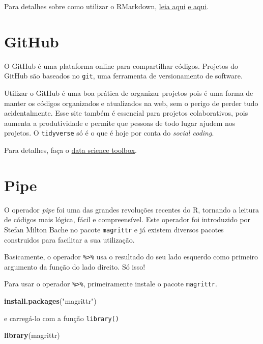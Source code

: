 \documentclass[]{book}
\newenvironment{Shaded}{\begin{snugshade}}{\end{snugshade}}
\newcommand{\KeywordTok}[1]{\textcolor[rgb]{0.13,0.29,0.53}{\textbf{{#1}}}}
\newcommand{\StringTok}[1]{\textcolor[rgb]{0.31,0.60,0.02}{{#1}}}
\newcommand{\NormalTok}[1]{{#1}}
\begin{document}
Para detalhes sobre como utilizar o RMarkdown,
\href{http://r4ds.had.co.nz/r-markdown.html}{leia aqui}
\href{http://rmarkdown.rstudio.com/lesson-1.html}{e aqui}.

\section{GitHub}\label{github}

O GitHub é uma plataforma online para compartilhar códigos. Projetos do
GitHub são baseados no \texttt{git}, uma ferramenta de versionamento de
software.

Utilizar o GitHub é uma boa prática de organizar projetos pois é uma
forma de manter os códigos organizados e atualizados na web, sem o
perigo de perder tudo acidentalmente. Esse site também é essencial para
projetos colaborativos, pois aumenta a produtividade e permite que
pessoas de todo lugar ajudem nos projetos. O \texttt{tidyverse} só é o
que é hoje por conta do \emph{social coding}.

Para detalhes, faça o
\href{https://www.coursera.org/learn/data-scientists-tools}{data science
toolbox}.

\section{Pipe}\label{pipe}

O operador \emph{pipe} foi uma das grandes revoluções recentes do R,
tornando a leitura de códigos mais lógica, fácil e compreensível. Este
operador foi introduzido por Stefan Milton Bache no pacote
\texttt{magrittr} e já existem diversos pacotes construidos para
facilitar a sua utilização.

Basicamente, o operador \texttt{\%\textgreater{}\%} usa o resultado do
seu lado esquerdo como primeiro argumento da função do lado direito. Só
isso!

Para usar o operador \texttt{\%\textgreater{}\%}, primeiramente instale
o pacote \texttt{magrittr}.

\begin{Shaded}
\begin{Highlighting}[]
\KeywordTok{install.packages}\NormalTok{(}\StringTok{"magrittr"}\NormalTok{)}
\end{Highlighting}
\end{Shaded}

e carregá-lo com a função \texttt{library()}

\begin{Shaded}
\begin{Highlighting}[]
\KeywordTok{library}\NormalTok{(magrittr)}
\end{Highlighting}
\end{Shaded}
\end{document}

